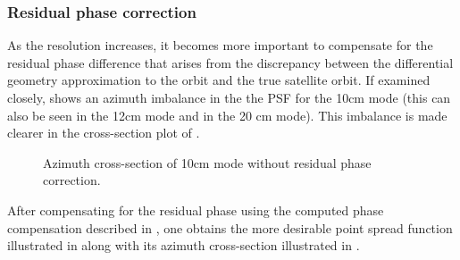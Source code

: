 \subsubsection{Residual phase correction}
As the resolution increases, it becomes more important to compensate for the residual phase difference that arises from the discrepancy between the differential geometry approximation to the orbit and the true satellite orbit. If examined closely,  shows an azimuth imbalance in the the PSF for the 10cm mode (this can also be seen in the 12cm mode and in the 20 cm mode). This imbalance is made clearer in the cross-section plot of .
\begin{figure}[ht!]
\begin{center}
 \caption{Azimuth cross-section of 10cm mode without residual phase correction.}
 \label{fg:azimuthCross10Unbalanced}
 \end{center}
\end{figure}
After compensating for the residual phase using the computed phase compensation described in , one obtains the more desirable point spread function illustrated in  along with its azimuth cross-section illustrated in .
